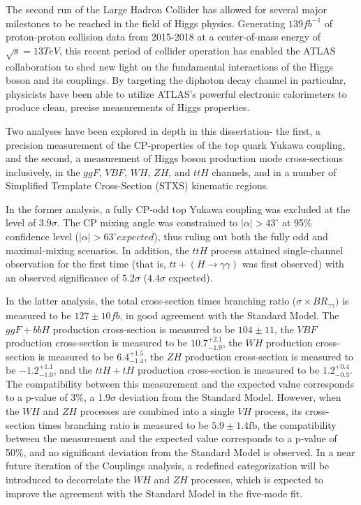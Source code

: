 The second run of the Large Hadron Collider has allowed for several major milestones to be reached in the field of Higgs physics. Generating $139 fb^{-1}$ of proton-proton collision data from 2015-2018 at a center-of-mass energy of $\sqrt{s} = 13 TeV$, this recent period of collider operation has enabled the ATLAS collaboration to shed new light on the fundamental interactions of the Higgs boson and its couplings. By targeting the diphoton decay channel in particular, physicists have been able to utilize ATLAS's powerful electronic calorimeters to produce clean, precise measurements of Higgs properties.

Two analyses have been explored in depth in this dissertation- the first, a precision measurement of the CP-properties of the top quark Yukawa coupling, and the second, a measurement of Higgs boson production mode cross-sections inclusively, in the $ggF$, $VBF$, $WH$, $ZH$, and $ttH$ channels, and in a number of Simplified Template Cross-Section (STXS) kinematic regions.

In the former analysis, a fully CP-odd top Yukawa coupling was excluded at the level of $3.9 \sigma$. The CP mixing angle was constrained to $|\alpha| > 43^{\circ}$ at 95\% confidence level ($|\alpha| > 63^{\circ} expected$), thus ruling out both the fully odd and maximal-mixing scenarios. In addition, the $ttH$ process attained single-channel observation for the first time (that is, $tt+(H \rightarrow \gamma \gamma)$ was first observed) with an observed significance of $5.2 \sigma$ ($4.4 \sigma$ expected). 

In the latter analysis, the total cross-section times branching ratio ($\sigma \times BR_{\gamma \gamma})$ is measured to be $127\pm 10 fb$, in good agreement with the Standard Model. The $ggF+bbH$ production cross-section is measured to be $104 \pm 11$, the $VBF$ production cross-section is measured to be $10.7^{+2.1}_{-1.9}$, the $WH$ production cross-section is measured to be $6.4^{+1.5}_{-1.4}$, the $ZH$ production cross-section is measured to be $-1.2^{+1.1}_{-1.0}$, and the $ttH+tH$ production cross-section is measured to be $1.2^{+0.4}_{-0.3}$. The compatibility between this measurement and the expected value corresponds to a p-value of 3\%, a 1.9$\sigma$ deviation from the Standard Model. However, when the $WH$ and $ZH$ processes are combined into a single $VH$ process, its cross-section times branching ratio is measured to be $5.9 \pm 1.4$fb, the compatibility between the measurement and the expected value corresponds to a p-value of 50\%, and no significant deviation from the Standard Model is observed. In a near future iteration of the Couplings analysis, a redefined categorization will be introduced to decorrelate the $WH$ and $ZH$ processes, which is expected to improve the agreement with the Standard Model in the five-mode fit.

